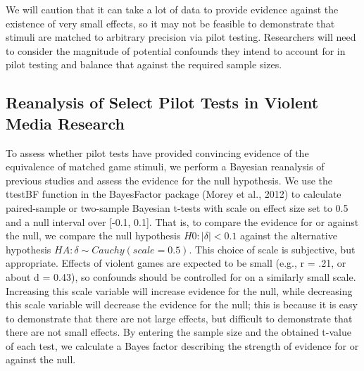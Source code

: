 \documentclass{article}
\begin{document}
We will caution that it can take a lot of data to provide evidence against the existence of very small effects, so it may not be feasible to demonstrate that stimuli are matched to arbitrary precision via pilot testing. Researchers will need to consider the magnitude of potential confounds they intend to account for in pilot testing and balance that against the required sample sizes.

\subsection{Reanalysis of Select Pilot Tests in Violent Media Research}
To assess whether pilot tests have provided convincing evidence of the equivalence of matched game stimuli, we perform a Bayesian reanalysis of previous studies and assess the evidence for the null hypothesis. We use the ttestBF function in the BayesFactor package (Morey et al., 2012) to calculate paired-sample or two-sample Bayesian t-tests with scale on effect size set to 0.5 and a null interval over [-0.1, 0.1]. That is, to compare the evidence for or against the null, we compare the null hypothesis $H0: |\delta| < 0.1$ against the alternative hypothesis $HA: \delta \sim Cauchy(scale = 0.5)$. This choice of scale is subjective, but appropriate. Effects of violent games are expected to be small (e.g., r = .21, or about d = 0.43), so confounds should be controlled for on a similarly small scale. Increasing this scale variable will increase evidence for the null, while decreasing this scale variable will decrease the evidence for the null; this is because it is easy to demonstrate that there are not large effects, but difficult to demonstrate that there are not small effects. By entering the sample size and the obtained t-value of each test, we calculate a Bayes factor describing the strength of evidence for or against the null.  
\end{document}
